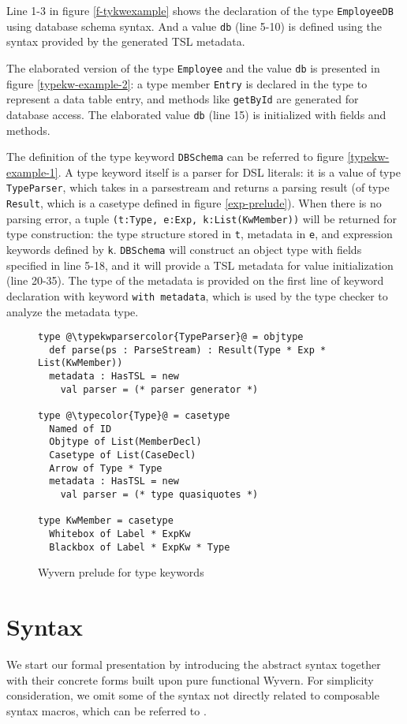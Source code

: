 \documentclass{sig-alternate}
\newcommand{\typekwparsercolor}[1]{\textcolor[HTML]{7C803E}{#1}}
\newcommand{\typecolor}[1]{\textcolor[HTML]{660066}{#1}}
\newcommand{\mycaption}[1]{\vspace{-4px}\caption{#1}\vspace{-2px}}
\begin{document}
Line 1-3 in figure \ref{f-tykwexample} shows the declaration of the type \verb|EmployeeDB| using database schema syntax. And a value \verb|db| (line 5-10) is defined using the syntax provided by the generated TSL metadata. 

The elaborated version of the type \verb|Employee| and the value \verb|db| is presented in figure \ref{typekw-example-2}: a type member \verb|Entry| is declared in the type to represent a data table entry, and methods like \verb|getById| are generated for database access. The elaborated value \verb|db| (line 15) is initialized with fields and methods.

The definition of the type keyword \verb|DBSchema| can be referred to figure \ref{typekw-example-1}. A type keyword itself is a parser for DSL literals: it is a value of type \verb|TypeParser|, which takes in a parsestream and returns a parsing result (of type \verb|Result|, which is a casetype defined in figure \ref{exp-prelude}). When there is no parsing error, a tuple \verb|(t:Type, e:Exp, k:List(KwMember))| will be returned for type construction: the type structure stored in \verb|t|, metadata in \verb|e|, and expression keywords defined by \verb|k|. \verb|DBSchema| will construct an object type with fields specified in line 5-18, and it will provide a TSL metadata for value initialization (line 20-35). The type of the metadata is provided on the first line of keyword declaration with keyword \verb|with metadata|, which is used by the type checker to analyze the metadata type.

\begin{figure}
\begin{lstlisting}[style=wyvern]
type @\typekwparsercolor{TypeParser}@ = objtype
  def parse(ps : ParseStream) : Result(Type * Exp * List(KwMember))
  metadata : HasTSL = new 
    val parser = (* parser generator *)

type @\typecolor{Type}@ = casetype
  Named of ID
  Objtype of List(MemberDecl)
  Casetype of List(CaseDecl)
  Arrow of Type * Type
  metadata : HasTSL = new
    val parser = (* type quasiquotes *)

type KwMember = casetype
  Whitebox of Label * ExpKw
  Blackbox of Label * ExpKw * Type
\end{lstlisting}
\mycaption{Wyvern prelude for type keywords}
\label{type-prelude}
\end{figure}



\section{Syntax}
We start our formal presentation by introducing the abstract syntax together with their concrete forms built upon pure functional Wyvern. For simplicity consideration, we omit some of the syntax not directly related to composable syntax macros, which can be referred to .
\end{document}
